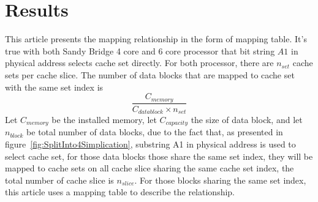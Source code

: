 \documentclass[conference]{IEEEtran}
\newcommand{\WordCapacity}{capacity}
\newcommand{\WordMemory}{memory}
\newcommand{\MemoryCapacity}{C_{\WordMemory}}
\newcommand{\WordDataBlock}{data block }
\newcommand{\NumberBlock}{n_{block}}
\newcommand{\DataBlockCapacity}{C_{\WordCapacity}}
\newcommand{\WordSet}{set}
\newcommand{\NumberSetEachSlice}{n_{\WordSet}}
\newcommand{\NUMSLICE}{n_{slice}}
\newcommand{\SandyBridge}{Sandy Bridge }
\begin{document}
\section{Results}
This article presents the mapping relationship in the form of mapping table. It's true with both \SandyBridge 4 core and 6 core processor that bit string $A1$ in physical address selects cache set directly.
For both processor, there are $\NumberSetEachSlice$ cache sets per cache slice. The number of data blocks that are mapped to cache set with the same set index is  
\begin{equation}
	\frac{\MemoryCapacity}{C_{\WordDataBlock} \times \NumberSetEachSlice} 
\end{equation}
Let $\MemoryCapacity$ be the installed memory, let $\DataBlockCapacity$ the size of data block, and let $\NumberBlock$ be total number of data blocks, due to the fact that, as presented in figure~\ref{fig:SplitInto4Simplication}, substring A1 in physical address is used to select cache set, for those data blocks those share the same set index, they will be mapped to cache sets on all cache slice sharing the same cache set index, the total number of cache slice is $\NUMSLICE$. For those blocks sharing the same set index, this article uses a mapping table to describe the relationship.
\end{document}
